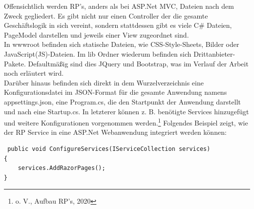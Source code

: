 \documentclass[a4paper,
12pt,
oneside]
{article}
\begin{document}
	Offensichtlich werden RP's, anders als bei ASP.Net MVC, Dateien nach dem Zweck gegliedert. Es gibt nicht nur einen Controller der die gesamte Geschäftslogik in sich vereint, sondern stattdessen gibt es viele C\# Dateien, PageModel darstellen und jeweils einer View zugeordnet sind. \\
	In wwwroot befinden sich statische Dateien, wie CSS-Style-Sheets, Bilder oder JavaScript(JS)-Dateien. Im lib Ordner wiederum befinden sich Drittanbieter-Pakete. Defaultmäßig sind dies JQuery und Bootstrap, was im Verlauf der Arbeit noch erläutert wird. \\
	Darüber hinaus befinden sich direkt in dem Wurzelverzeichnis eine Konfigurationsdatei im JSON-Format für die gesamte Anwendung namens \glqq appsettings.json\grqq, eine \glqq Program.cs\grqq, die den Startpunkt der Anwendung darstellt und nach eine \glqq Startup.cs\grqq. In letzterer können z. B. benötigte Services hinzugefügt und weitere Konfigurationen vorgenommen werden.\footnote{o. V., Aufbau RP's, 2020} Folgendes Beispiel zeigt, wie der RP Service in eine ASP.Net Webanwendung integriert werden können:
	\lstset{style=csharp}
	\begin{lstlisting}
 public void ConfigureServices(IServiceCollection services)
{
	services.AddRazorPages();
}
	\end{lstlisting}
	
\end{document}

